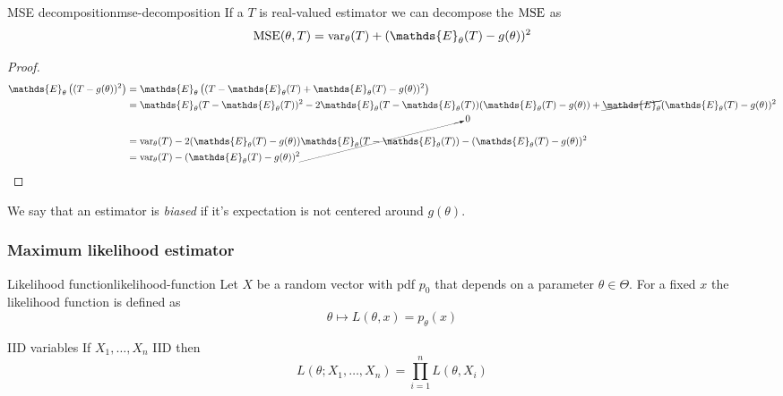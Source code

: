 \documentclass[12pt]{extarticle}
\renewcommand{\var}{{\operatorfont var}}
\newcommand{\E}{\mathds{E}}
\begin{document}
\begin{proposition}{MSE decomposition}{mse-decomposition}
    If a $T$ is real-valued estimator we can decompose the $\MSE$ as
    \begin{equation}
        \MSE(\theta, T) = \var_\theta(T) + (\E_\theta(T) - g(\theta))^2
    \end{equation}
\end{proposition}
\begin{proof}
    \begin{align}
        \E_\theta\left((T - g(\theta))^2\right) & = \E_\theta\left((T -\E_\theta(T) + \E_\theta(T) - g(\theta))^2\right)                                                                \\
                                                & = \E_\theta(T-\E_\theta(T))^2 - 2\E_\theta(T-\E_\theta(T))(\E_\theta(T) - g(\theta)) + \cancel{\E_\theta}(\E_\theta(T) - g(\theta))^2 \\
                                                & = \var_\theta(T) - 2 (\E_\theta(T) - g(\theta)) \cancelto{0}{\E_\theta(T-\E_\theta(T))} - (\E_\theta(T) - g(\theta))^2                \\
                                                & = \var_\theta(T) - (\E_\theta(T) - g(\theta))^2
    \end{align}
\end{proof}

We say that an estimator is \emph{biased} if it's expectation is not centered around $g(\theta)$.

\subsubsection{Maximum likelihood estimator}

\begin{definition}{Likelihood function}{likelihood-function}
    Let $X$ be a random vector with pdf $p_0$ that depends on a parameter $\theta \in \Theta$.
    For a fixed $x$ the likelihood function is defined as
    \begin{equation}
        \theta \mapsto L(\theta, x) = p_\theta(x)
    \end{equation}
\end{definition}

\begin{lemma}{IID variables}{}
    If $X_1, \dots, X_n$ IID then
    \begin{equation}
        L(\theta; X_1, \dots, X_n) = \prod_{i = 1}^{n} L(\theta, X_i)
    \end{equation}
\end{lemma}
\end{document}
